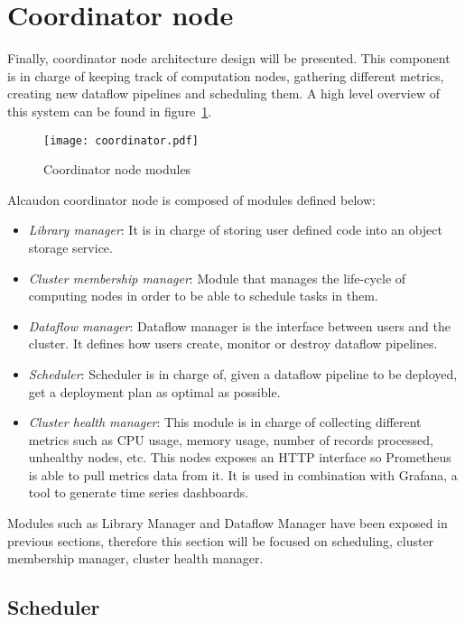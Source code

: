 \section{Coordinator node}

Finally, coordinator node architecture design will be presented. This component
is in charge of keeping track of computation nodes, gathering different metrics,
creating new dataflow pipelines and scheduling them. A high level overview of this
system can be found in figure~\ref{fig:coordinatormodules}.

\begin{figure}[!h]
  \centering
  \texttt{[image: coordinator.pdf]}
  \caption{Coordinator node modules}
  \label{fig:coordinatormodules}
\end{figure}

Alcaudon coordinator node is composed of modules defined below:
\begin{itemize}
  \item \textit{Library manager}: It is in charge of storing user defined code
    into an object storage service.
  \item \textit{Cluster membership manager}: Module that manages the life-cycle of
    computing nodes in order to be able to schedule tasks in them.
  \item \textit{Dataflow manager}: Dataflow manager is the interface between
    users and the cluster. It defines how users create, monitor or destroy
    dataflow pipelines.
  \item \textit{Scheduler}: Scheduler is in charge of, given a dataflow pipeline
    to be deployed, get a deployment plan as optimal as possible.
  \item \textit{Cluster health manager}: This module is in charge of collecting
    different metrics such as CPU usage, memory usage, number of records
    processed, unhealthy nodes, etc. This nodes exposes an \acs{HTTP} interface
    so Prometheus is able to pull metrics data from it. It is used in
    combination with Grafana, a tool to generate time series dashboards.
\end{itemize}

Modules such as Library Manager and Dataflow Manager have been exposed in
previous sections, therefore this section will be focused on scheduling, cluster
membership manager, cluster health manager.

\subsection{Scheduler}

